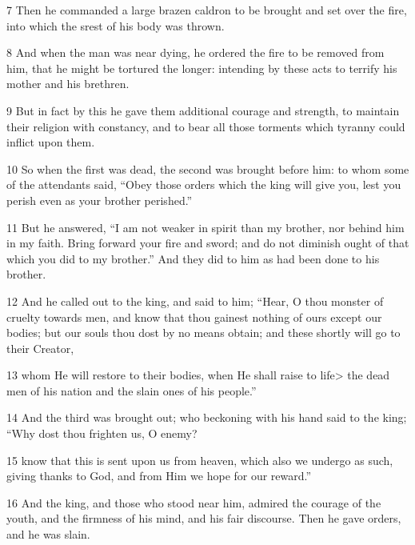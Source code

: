 \par 7 Then he commanded a large brazen caldron to be brought and set over the fire, into which the srest of his body was thrown. 

\par 8 And when the man was near dying, he ordered the fire to be removed from him, that he might be tortured the longer: intending by these acts to terrify his mother and his brethren. 

\par 9 But in fact by this he gave them additional courage and strength, to maintain their religion with constancy, and to bear all those torments which tyranny could inflict upon them. 

\par 10 So when the first was dead, the second was brought before him: to whom some of the attendants said, “Obey those orders which the king will give you, lest you perish even as your brother perished.” 

\par 11 But he answered, “I am not weaker in spirit than my brother, nor behind him in my faith. Bring forward your fire and sword; and do not diminish ought of that which you did to my brother.” And they did to him as had been done to his brother. 

\par 12 And he called out to the king, and said to him; “Hear, O thou monster of cruelty towards men, and know that thou gainest nothing of ours except our bodies; but our souls thou dost by no means obtain; and these shortly will go to their Creator, 

\par 13 whom He will restore to their bodies, when He shall raise to life> the dead men of his nation and the slain ones of his people.” 

\par 14 And the third was brought out; who beckoning with his hand said to the king; “Why dost thou frighten us, O enemy? 

\par 15 know that this is sent upon us from heaven, which also we undergo as such, giving thanks to God, and from Him we hope for our reward.” 

\par 16 And the king, and those who stood near him, admired the courage of the youth, and the firmness of his mind, and his fair discourse. Then he gave orders, and he was slain. 

